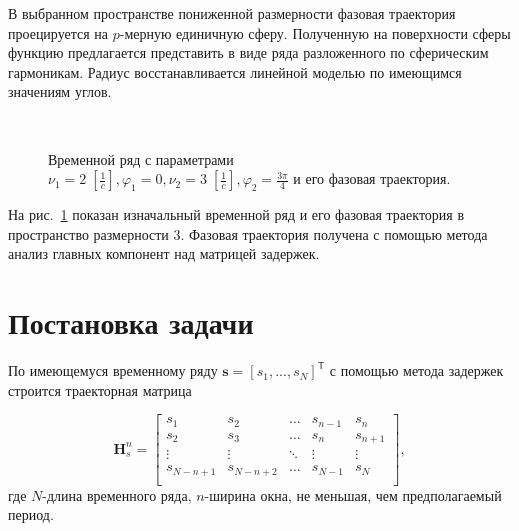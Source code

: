 \documentclass[12pt,twoside]{article}
\begin{document}
В выбранном пространстве пониженной размерности фазовая траектория проецируется на $p$-мерную единичную сферу.
Полученную на поверхности сферы функцию предлагается представить в виде ряда разложенного по сферическим гармоникам.
Радиус восстанавливается линейной моделью по имеющимся значениям углов.

\begin{figure}[h]
\centering
  \\
\caption{Временной ряд с параметрами $\nu_1 = 2\;[\frac{1}{c}], \varphi_1 = 0,\nu_2 = 3\;[\frac{1}{c}],\varphi_2 = \frac{3\pi}{4}$ и его фазовая траектория. }
\label{fg:initial_traj}
\end{figure}

На рис.~\ref{fg:initial_traj} показан изначальный временной ряд и его фазовая траектория в пространство размерности 3.
Фазовая траектория получена с помощью метода анализ главных компонент над матрицей задержек.

\section{Постановка задачи}
По имеющемуся временному ряду $\mathbf{s}=[s_1,...,s_N]^{\mathsf{T}}$ с помощью метода задержек строится траекторная матрица

\begin{equation}
\mathbf{H}_{s}^{n} = 
\begin{bmatrix} 
	s_{1} & s_{2} & \ldots &s_{n-1} &s_{n}\\
	s_{2} & s_{3} & \ldots &s_{n} &s_{n+1}\\
	\vdots& \vdots & \ddots & \vdots & \vdots\\
	s_{N-n+1} & s_{N-n+2} &\ldots&s_{N-1} &s_{N}\\
\end{bmatrix},
\label{eq:hankel_matrix}
\end{equation}
где $N$-длина временного ряда, $n$-ширина окна, не меньшая, чем предполагаемый период.
\end{document}

